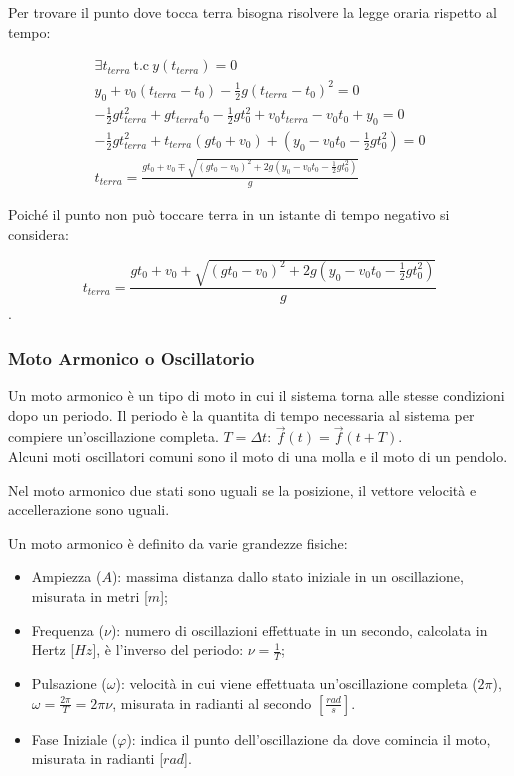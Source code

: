 \documentclass{article}
\numberwithin{equation}{subsection}
\begin{document}
Per trovare il punto dove tocca terra bisogna risolvere 
la legge oraria rispetto al tempo:

\begin{gather*}
    \exists t_{terra}\:\mbox{t.c}\: y(t_{terra}) = 0\\
    y_0 + v_0(t_{terra} - t_0)-\displaystyle\frac{1}{2}g
    (t_{terra} - t_0)^{2} = 0\\
    -\displaystyle\frac{1}{2}gt_{terra}^{2} + gt_{terra}t_0
    -\displaystyle\frac{1}{2}gt_0^{2}+v_0t_{terra} - v_0t_0 +y_0 =0\\
    -\displaystyle\frac{1}{2}gt_{terra}^{2}+t_{terra}
    (gt_0+v_0) + \left(y_0-v_0t_0 
    -\displaystyle\frac{1}{2}gt_0^{2}\right)=0\\
    t_{terra} = \displaystyle\frac{gt_0+v_0 \mp\sqrt{(gt_0-v_0)^{2}+2g\left(y_0-v_0t_0-\displaystyle\frac{1}{2}gt_0^{2}\right)}}{g}
\end{gather*}

Poiché il punto non può toccare terra in un istante di tempo 
negativo si considera:

\begin{equation}
    t_{terra} = \displaystyle\frac{gt_0+v_0 +\sqrt{(gt_0-v_0)^{2}+2g\left(y_0-v_0t_0-\displaystyle\frac{1}{2}gt_0^{2}\right)}}{g}
\end{equation}.

\subsubsection{Moto Armonico o Oscillatorio}

Un moto armonico è un tipo di moto in cui il sistema torna 
alle stesse condizioni dopo un periodo.
Il periodo è la quantita di tempo necessaria 
al sistema per compiere un'oscillazione completa.
$T = \Delta t$: $\vec{f}(t) = \vec{f}(t + T)$.
\\
Alcuni moti oscillatori comuni sono il moto di una molla e il 
moto di un pendolo.

Nel moto armonico due stati sono uguali se la posizione, 
il vettore velocità e accellerazione sono uguali.

Un moto armonico è definito da varie grandezze fisiche:

\begin{itemize}
    \item Ampiezza ($A$): massima distanza dallo stato iniziale 
    in un oscillazione, misurata in metri [$m$];
    \item Frequenza ($\nu$): numero di oscillazioni effettuate 
    in un secondo, calcolata in Hertz [$Hz$], è l'inverso del 
    periodo: $\nu = \displaystyle\frac{1}{T}$;
    \item Pulsazione ($\omega$): velocità in cui viene 
    effettuata un'oscillazione completa ($2\pi$), $\omega = \displaystyle\frac{2\pi}{T} = 2\pi\nu$, 
    misurata in radianti al secondo $\left[\displaystyle\frac{rad}{s}\right]$.
    \item Fase Iniziale ($\varphi$): indica il punto dell'oscillazione 
    da dove comincia il moto, misurata in radianti [$rad$].
\end{itemize}
\end{document}
